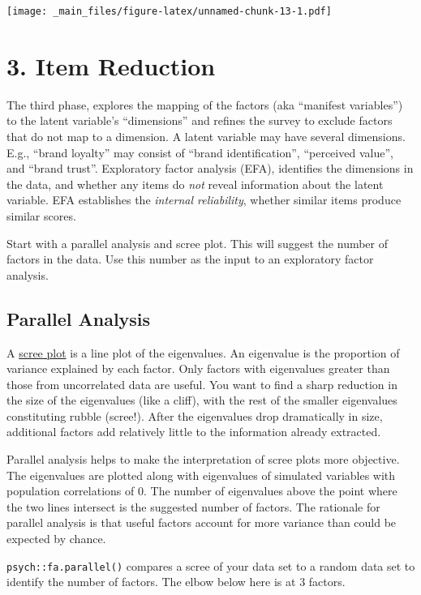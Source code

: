 \documentclass[
]{book}
\theoremstyle{definition}
\theoremstyle{definition}
\theoremstyle{definition}
\theoremstyle{definition}
\theoremstyle{remark}
\begin{document}
\texttt{[image: \_main\_files/figure-latex/unnamed-chunk-13-1.pdf]}

\hypertarget{item-reduction}{%
\section{3. Item Reduction}\label{item-reduction}}

The third phase, explores the mapping of the factors (aka ``manifest variables'') to the latent variable's ``dimensions'' and refines the survey to exclude factors that do not map to a dimension. A latent variable may have several dimensions. E.g., ``brand loyalty'' may consist of ``brand identification'', ``perceived value'', and ``brand trust''. Exploratory factor analysis (EFA), identifies the dimensions in the data, and whether any items do \emph{not} reveal information about the latent variable. EFA establishes the \emph{internal reliability}, whether similar items produce similar scores.

Start with a parallel analysis and scree plot. This will suggest the number of factors in the data. Use this number as the input to an exploratory factor analysis.

\hypertarget{parallel-analysis}{%
\subsection{Parallel Analysis}\label{parallel-analysis}}

A \href{https://www.sciencedirect.com/topics/mathematics/scree-plot}{scree plot} is a line plot of the eigenvalues. An eigenvalue is the proportion of variance explained by each factor. Only factors with eigenvalues greater than those from uncorrelated data are useful. You want to find a sharp reduction in the size of the eigenvalues (like a cliff), with the rest of the smaller eigenvalues constituting rubble (scree!). After the eigenvalues drop dramatically in size, additional factors add relatively little to the information already extracted.

Parallel analysis helps to make the interpretation of scree plots more objective. The eigenvalues are plotted along with eigenvalues of simulated variables with population correlations of 0. The number of eigenvalues above the point where the two lines intersect is the suggested number of factors. The rationale for parallel analysis is that useful factors account for more variance than could be expected by chance.

\texttt{psych::fa.parallel()} compares a scree of your data set to a random data set to identify the number of factors. The elbow below here is at 3 factors.
\end{document}
